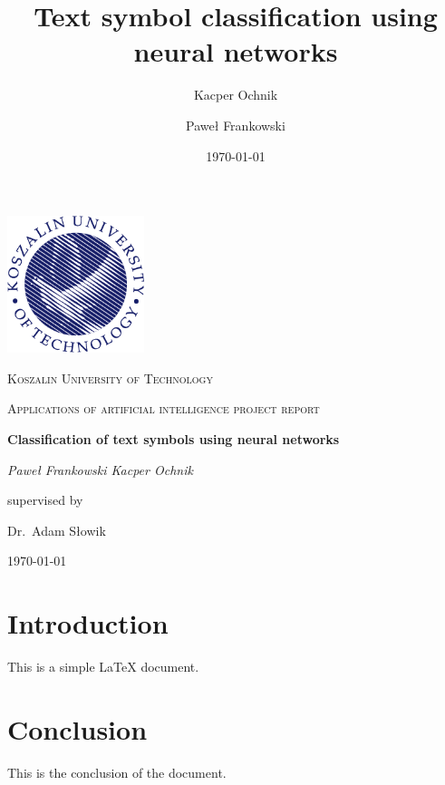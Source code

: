 \documentclass{article}
\title{Text symbol classification using neural networks}
\author{Kacper Ochnik \and Paweł Frankowski}
\date{\today}
\begin{document}
\begin{titlepage}
	\centering
	\includegraphics[width=0.3\textwidth]{Logo_PK_kolor_EN_PNG.png}\par\vspace{1cm}
	{\textsc{Koszalin University of Technology} \par}
	\vspace{1cm}
	{\Large \textsc{Applications of artificial intelligence project report}\par}
	\vspace{1.5cm}
	{\huge\bfseries Classification of text symbols using neural networks\par}
	\vspace{2cm}
	{\Large\itshape {Paweł Frankowski \space Kacper Ochnik}\par}
	\vfill
	supervised by\par
	Dr.~Adam Słowik

	\vfill

	{\large \today\par}
\end{titlepage}

\tableofcontents
\newpage

\section{Introduction}
This is a simple LaTeX document.

\section{Conclusion}
This is the conclusion of the document.
\end{document}
